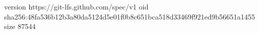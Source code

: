 version https://git-lfs.github.com/spec/v1
oid sha256:48fa536b12b3a80da5124d5e01f0b8c651bca518d33469f921ed9b56651a1455
size 87544
